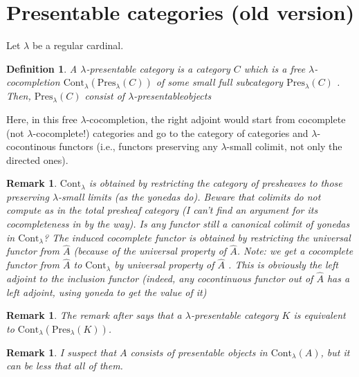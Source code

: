 \documentclass{article}
\newcommand{\Cont}[1]{\text{Cont}_{#1}}
\newcommand{\Pres}[1]{\text{Pres}_{#1}}
\newtheorem{definition}[theorem]{Definition}
\newtheorem{remark}[theorem]{Remark}
\begin{document}
  \section{Presentable categories (old version)}
  Let $\lambda$ be a regular cardinal.
  \begin{definition}
  A $\lambda$-presentable category is a
  category $C$ which is a free $\lambda$-cocompletion
  $\Cont\lambda(\Pres\lambda(C))$ of
  some small full subcategory $\Pres\lambda(C)$
     \cite[Representation theorem 1.46]{adamek_rosicky}.
	  Then, $\Pres\lambda(C)$ consist of \emph{$\lambda$-presentableobjects}
  \end{definition}

  Here, in this free $\lambda$-cocompletion, the right adjoint would start
  from 
  cocomplete (not $\lambda$-cocomplete!) categories and go to the category of
  categories and $\lambda$-cocontinous functors (i.e., functors preserving any
  $\lambda$-small colimit, not only the directed ones).
  \begin{remark}
	  $\Cont\lambda$ is 
	  obtained by restricting the category of presheaves to those preserving $\lambda$-small limits (as the yonedas do). Beware that colimits do not compute as in the total presheaf category (I can't find an argument for its cocompleteness in \cite{adamek_rosicky} by the way).
	  Is any functor still a canonical colimit of yonedas in $\Cont\lambda$?
	  The induced cocomplete functor is obtained by restricting the universal functor from $\hat{A}$ (because of the universal property of $\hat{A}$. Note: we get a cocomplete functor  from 
	  $\hat{A}$ to $\Cont\lambda$ by universal property of $\hat{A}$ .
	  This is obviously the left adjoint to the inclusion functor
	  (indeed, any cocontinuous functor out of $\hat{A}$ has a left adjoint, using yoneda to get the value of it)
  \end{remark}
  \begin{remark}
	  The remark after
     \cite[Representation theorem 1.46]{adamek_rosicky} says that a $\lambda$-presentable
	  category $K$ is equivalent to $\Cont\lambda(\Pres\lambda(K))$.
  \end{remark}
  \begin{remark}
	  I suspect that $A$ consists of presentable objects in $\Cont\lambda(A)$, but it can be less that all of them.
  \end{remark}
\end{document}
